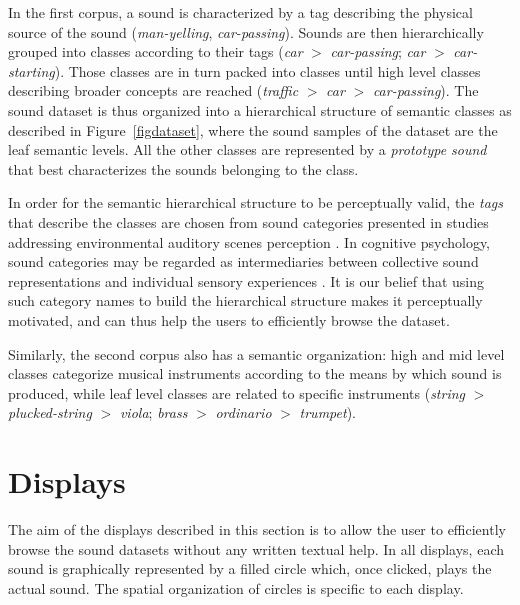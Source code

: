 \documentclass{aes2e}
\begin{document}
In the first corpus, a sound is characterized by a tag describing the physical source of the sound (\textit{man-yelling}, \textit{car-passing}). Sounds are then hierarchically grouped into classes according to their tags (\textit{car} $>$ \textit{car-passing}; \textit{car} $>$ \textit{car-starting}). Those classes are in turn packed into classes until high level classes describing broader concepts are reached (\textit{traffic} $>$ \textit{car} $>$ \textit{car-passing}). The sound dataset is thus organized into a hierarchical structure of semantic classes as described in Figure~\ref{figdataset}, where the sound samples of the dataset are the leaf semantic levels. All the other classes are represented by a \textit{prototype sound} that best characterizes the sounds belonging to the class. 

In order for the semantic hierarchical structure to be perceptually valid, the \textit{tags} that describe the classes  are chosen from sound categories presented in studies addressing environmental auditory scenes perception \cite{niessen2010categories, brown2011towards, dubois2006cognitive}. In cognitive psychology, sound categories may be regarded as intermediaries between collective sound representations and individual sensory experiences \cite{dubois2006cognitive}. It is our belief that using such category names to build the hierarchical structure makes it perceptually motivated, and can thus help the users to efficiently browse the dataset.

Similarly, the second corpus also has a semantic organization: high and mid level classes categorize musical instruments according to the means by which sound is produced, while leaf level classes are related to specific instruments (\textit{string} $>$ \textit{plucked-string} $>$ \textit{viola}; \textit{brass} $>$ \textit{ordinario} $>$ \textit{trumpet}).


\section{Displays} \label{display}

The aim of the displays described in this section is to allow the user to efficiently browse the sound datasets without any written textual help. In all displays, each sound is graphically represented by a filled circle which, once clicked, plays the actual sound. The spatial organization of circles is specific to each display.
\end{document}
